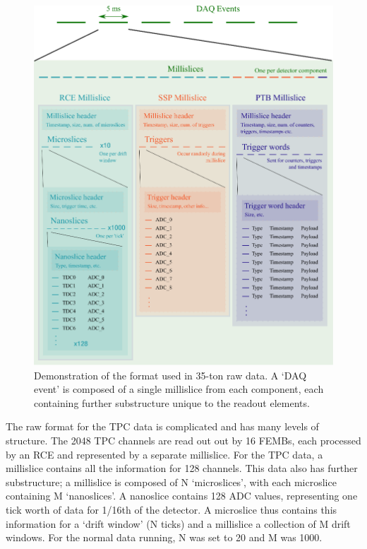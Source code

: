 \begin{figure}
  \centering
  \includegraphics[width=14cm]{data_format.eps}
  \caption[Demonstration of the format used in 35-ton raw data.]{Demonstration of the format used in 35-ton raw data.  A `DAQ event' is composed of a single millislice from each component, each containing further substructure unique to the readout elements.}
  \label{fig:35tonDataFormat}
\end{figure}

The raw format for the TPC data is complicated and has many levels of structure.  The 2048 TPC channels are read out out by 16 FEMBs, each processed by an RCE and represented by a separate millislice.  For the TPC data, a millislice contains all the information for 128 channels.  This data also has further substructure; a millislice is composed of N `microslices', with each microslice containing M `nanoslices'.  A nanoslice contains 128 ADC values, representing one tick worth of data for 1/16th of the detector.  A microslice thus contains this information for a `drift window' (N ticks) and a millislice a collection of M drift windows.  For the normal data running, N was set to 20 and M was 1000.

